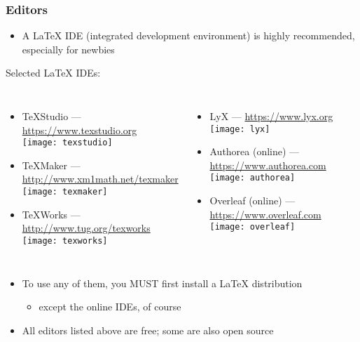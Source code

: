 \documentclass{beamer}
\begin{document}
\begin{frame}
 \frametitle{Editors}
  


\begin{itemize}
  \item A \LaTeX{} IDE (integrated development environment) is highly recommended, especially for newbies
\end{itemize}

\begin{block}{Selected \LaTeX{} IDEs:}

\begin{columns}


\begin{itemize}
  \item TeXStudio --- \url{https://www.texstudio.org} \\ \texttt{[image: texstudio]}
  \item TeXMaker --- \url{http://www.xm1math.net/texmaker} \\ \texttt{[image: texmaker]}
  \item TeXWorks --- \url{http://www.tug.org/texworks} \\ \texttt{[image: texworks]}
\end{itemize}


\begin{itemize}
  \item LyX --- \url{https://www.lyx.org} \\ \texttt{[image: lyx]}
  \item Authorea (online) --- \url{https://www.authorea.com} \\ \texttt{[image: authorea]}
  \item Overleaf (online) --- \url{https://www.overleaf.com} \\ \texttt{[image: overleaf]}
\end{itemize}

\end{columns}

\end{block}

\begin{itemize}
  \item To use any of them, you MUST first install a \LaTeX{} distribution
\begin{itemize}
  \item except the online IDEs, of course
\end{itemize}
  \item All editors listed above are free; some are also open source
\end{itemize}

  
\end{frame}
\end{document}
